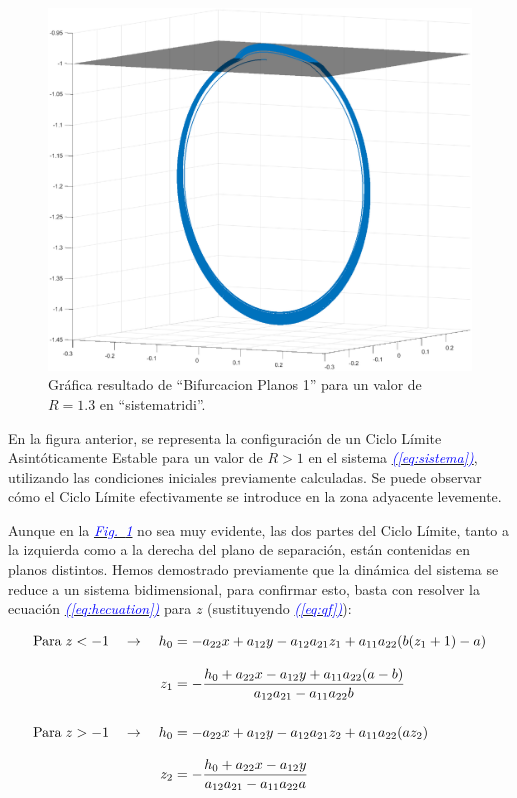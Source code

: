 \documentclass[12pt,a4paper]{report} %
\newcommand{\fref}[1]{\hyperref[#1]{\textcolor{blue}{\textit{Fig.~\ref*{#1}}}}}
\newcommand{\eref}[1]{\hyperref[#1]{\textcolor{blue}{\textit{(\ref*{#1})}}}}
\begin{document}
	\begin{figure}[h]
		\centering
		\includegraphics[width=1\textwidth]{ciclocir.eps}
		\caption{Gráfica resultado de ``Bifurcacion Planos 1'' para un valor de $R=1.3$ en ``sistematridi''.}
		\label{fig:ciclocircuito}
	\end{figure}\smallskip
	
		\vspace{0.5cm}\noindent En la figura anterior, se representa la configuración de un Ciclo Límite Asintóticamente Estable para un valor de $R>1$ en el sistema \eref{eq:sistema}, utilizando las condiciones iniciales previamente calculadas. Se puede observar cómo el Ciclo Límite efectivamente se introduce en la zona adyacente levemente.
		
		\newpage
		
	Aunque en la \fref{fig:ciclocircuito} no sea muy evidente, las dos partes del Ciclo Límite, tanto a la izquierda como a la derecha del plano de separación, están contenidas en planos distintos. Hemos demostrado previamente que la dinámica del sistema se reduce a un sistema bidimensional, para confirmar esto, basta con resolver la ecuación \eref{eq:hecuation} para $z$ (sustituyendo \eref{eq:qf}):
		
		\begin{subequations}
			\label{eq:funcz}
			\begin{align}
				\text{Para}\; z<-1 \quad \rightarrow \quad h_0&=-a_{22}x+a_{12}y-a_{12}a_{21}z_1+a_{11}a_{22}(b(z_1+1)-a)\notag\\[3mm]
				z_1&=-\frac{h_0+a_{22}x-a_{12}y+a_{11}a_{22}(a-b)}{a_{12}a_{21}-a_{11}a_{22}b} \label{eq:z1} \\[5mm]
				\text{Para}\; z>-1 \quad \rightarrow \quad h_0&=-a_{22}x+a_{12}y-a_{12}a_{21}z_2+a_{11}a_{22}(az_2)\notag\\[3mm]
				z_2&=-\frac{h_0+a_{22}x-a_{12}y}{a_{12}a_{21}-a_{11}a_{22}a} \label{eq:z2}
			\end{align}
		\end{subequations}
		
\end{document}
